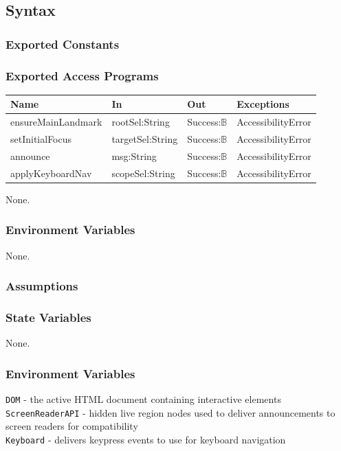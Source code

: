 \documentclass[12pt, titlepage]{article}
\begin{document}
\subsection{Syntax}

\subsubsection{Exported Constants}

\subsubsection{Exported Access Programs}

\begin{center}
  \begin{tabular}{p{4cm} p{4cm} p{3cm} p{3cm}}
    \hline
    \textbf{Name} & \textbf{In} & \textbf{Out} & \textbf{Exceptions} \\
    \hline
    ensureMainLandmark & rootSel:String & Success:\(\mathbb{B}\) &
    AccessibilityError\\
    setInitialFocus & targetSel:String & Success:\(\mathbb{B}\) &
    AccessibilityError\\
    announce & msg:String & Success:\(\mathbb{B}\) & AccessibilityError\\
    applyKeyboardNav & scopeSel:String & Success:\(\mathbb{B}\) &
    AccessibilityError\\
    \hline
  \end{tabular}
\end{center}

  None.
  
  \subsubsection{Environment Variables}
  None.
  
  \subsubsection{Assumptions}

\subsubsection{State Variables}

None.

\subsubsection{Environment Variables}
\texttt{DOM} - the active HTML document containing interactive elements \\
\texttt{ScreenReaderAPI} - hidden live region nodes used to deliver
announcements to screen readers
for compatibility\\
\texttt{Keyboard} - delivers keypress events to use for keyboard navigation\\
\end{document}
